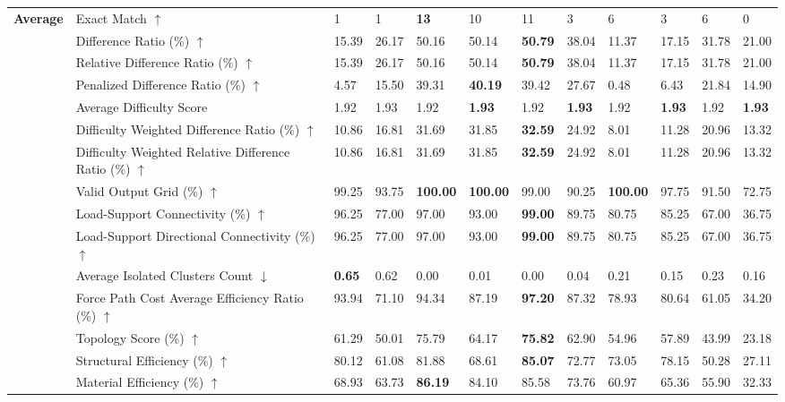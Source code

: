 \begin{table}[!h]
{\begin{tabular}{llllllllllll}
\midrule
\textbf{Average} & Exact Match $\uparrow$ & 1 & 1 & \textbf{13} & 10 & 11 & 3 & 6 & 3 & 6 & 0 \\
 & Difference Ratio (\%) $\uparrow$ & 15.39 & 26.17 & 50.16 & 50.14 & \textbf{50.79} & 38.04 & 11.37 & 17.15 & 31.78 & 21.00 \\
 & Relative Difference Ratio (\%) $\uparrow$ & 15.39 & 26.17 & 50.16 & 50.14 & \textbf{50.79} & 38.04 & 11.37 & 17.15 & 31.78 & 21.00 \\
 & Penalized Difference Ratio (\%) $\uparrow$ & 4.57 & 15.50 & 39.31 & \textbf{40.19} & 39.42 & 27.67 & 0.48 & 6.43 & 21.84 & 14.90 \\
 & Average Difficulty Score & 1.92 & 1.93 & 1.92 & \textbf{1.93} & 1.92 & \textbf{1.93} & 1.92 & \textbf{1.93} & 1.92 & \textbf{1.93} \\
 & Difficulty Weighted Difference Ratio (\%) $\uparrow$ & 10.86 & 16.81 & 31.69 & 31.85 & \textbf{32.59} & 24.92 & 8.01 & 11.28 & 20.96 & 13.32 \\
 & Difficulty Weighted Relative Difference Ratio (\%) $\uparrow$ & 10.86 & 16.81 & 31.69 & 31.85 & \textbf{32.59} & 24.92 & 8.01 & 11.28 & 20.96 & 13.32 \\
 & Valid Output Grid (\%) $\uparrow$ & 99.25 & 93.75 & \textbf{100.00} & \textbf{100.00} & 99.00 & 90.25 & \textbf{100.00} & 97.75 & 91.50 & 72.75 \\
 & Load-Support Connectivity (\%) $\uparrow$ & 96.25 & 77.00 & 97.00 & 93.00 & \textbf{99.00} & 89.75 & 80.75 & 85.25 & 67.00 & 36.75 \\
 & Load-Support Directional Connectivity (\%) $\uparrow$ & 96.25 & 77.00 & 97.00 & 93.00 & \textbf{99.00} & 89.75 & 80.75 & 85.25 & 67.00 & 36.75 \\
 & Average Isolated Clusters Count $\downarrow$ & \textbf{0.65} & 0.62 & 0.00 & 0.01 & 0.00 & 0.04 & 0.21 & 0.15 & 0.23 & 0.16 \\
 & Force Path Cost Average Efficiency Ratio (\%) $\uparrow$ & 93.94 & 71.10 & 94.34 & 87.19 & \textbf{97.20} & 87.32 & 78.93 & 80.64 & 61.05 & 34.20 \\
 & Topology Score (\%) $\uparrow$ & 61.29 & 50.01 & 75.79 & 64.17 & \textbf{75.82} & 62.90 & 54.96 & 57.89 & 43.99 & 23.18 \\
 & Structural Efficiency (\%) $\uparrow$ & 80.12 & 61.08 & 81.88 & 68.61 & \textbf{85.07} & 72.77 & 73.05 & 78.15 & 50.28 & 27.11 \\
 & Material Efficiency (\%) $\uparrow$ & 68.93 & 63.73 & \textbf{86.19} & 84.10 & 85.58 & 73.76 & 60.97 & 65.36 & 55.90 & 32.33 \\

\end{tabular}}
\end{table}
